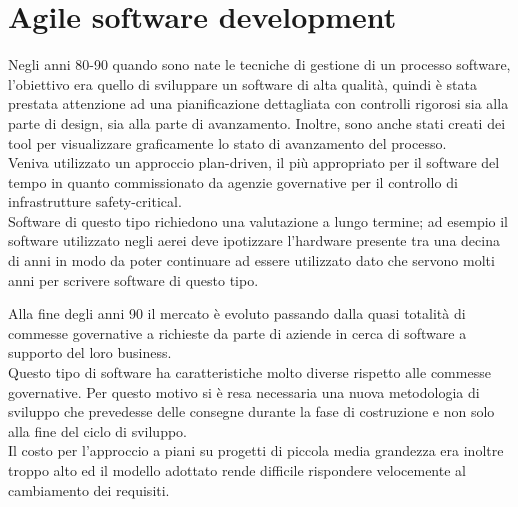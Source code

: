 \section{Agile software development}
\label{sec:03_modello_agile}
Negli anni 80-90 quando sono nate le tecniche di gestione di un processo software, l'obiettivo era quello di sviluppare un software di alta qualità, quindi è stata prestata attenzione ad una pianificazione dettagliata con controlli rigorosi sia alla parte di design, sia alla parte di avanzamento.
Inoltre, sono anche stati creati dei tool per visualizzare graficamente lo stato di avanzamento del processo.\\
Veniva utilizzato un approccio plan-driven, il più appropriato per il software del tempo in quanto commissionato da agenzie governative per il controllo di infrastrutture safety-critical.\\
Software di questo tipo richiedono una valutazione a lungo termine; ad esempio il software utilizzato negli aerei deve ipotizzare l'hardware presente tra una decina di anni in modo da poter continuare ad essere utilizzato dato che servono molti anni per scrivere software di questo tipo.

Alla fine degli anni 90 il mercato è evoluto passando dalla quasi totalità di commesse governative a richieste da parte di aziende in cerca di software a supporto del loro business.\\
Questo tipo di software ha caratteristiche molto diverse rispetto alle commesse governative.
Per questo motivo si è resa necessaria una nuova metodologia di sviluppo che prevedesse delle consegne durante la fase di costruzione e non solo alla fine del ciclo di sviluppo.\\
Il costo per l'approccio a piani su progetti di piccola media grandezza era inoltre troppo alto ed il modello adottato rende difficile rispondere velocemente al cambiamento dei requisiti.

